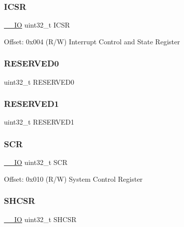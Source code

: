 \subsubsection{\texorpdfstring{ICSR}{ICSR}}
{\footnotesize\ttfamily \mbox{\hyperlink{core__cm0plus_8h_aec43007d9998a0a0e01faede4133d6be}{\+\_\+\+\_\+\+IO}} uint32\+\_\+t I\+C\+SR}

Offset\+: 0x004 (R/W) Interrupt Control and State Register \mbox{\label{struct_s_c_b___type_af86c61a5d38a4fc9cef942a12744486b}} 
\subsubsection{\texorpdfstring{RESERVED0}{RESERVED0}}
{\footnotesize\ttfamily uint32\+\_\+t R\+E\+S\+E\+R\+V\+E\+D0}

\mbox{\label{struct_s_c_b___type_ac4ac04e673b5b8320d53f7b0947db902}} 
\subsubsection{\texorpdfstring{RESERVED1}{RESERVED1}}
{\footnotesize\ttfamily uint32\+\_\+t R\+E\+S\+E\+R\+V\+E\+D1}

\mbox{\label{struct_s_c_b___type_a64a95891ad3e904dd5548112539c1c98}} 
\subsubsection{\texorpdfstring{SCR}{SCR}}
{\footnotesize\ttfamily \mbox{\hyperlink{core__cm0plus_8h_aec43007d9998a0a0e01faede4133d6be}{\+\_\+\+\_\+\+IO}} uint32\+\_\+t S\+CR}

Offset\+: 0x010 (R/W) System Control Register \mbox{\label{struct_s_c_b___type_a04d136e5436e5fa2fb2aaa78a5f86b19}} 
\subsubsection{\texorpdfstring{SHCSR}{SHCSR}}
{\footnotesize\ttfamily \mbox{\hyperlink{core__cm0plus_8h_aec43007d9998a0a0e01faede4133d6be}{\+\_\+\+\_\+\+IO}} uint32\+\_\+t S\+H\+C\+SR}

